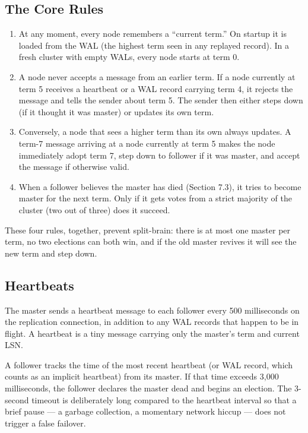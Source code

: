 \documentclass[11pt,a4paper]{article}
\begin{document}
\subsection{The Core Rules}
\begin{enumerate}
\item At any moment, every node remembers a ``current term.'' On startup it is loaded from the WAL (the highest term seen in any replayed record). In a fresh cluster with empty WALs, every node starts at term 0.
\item A node never accepts a message from an earlier term. If a node currently at term 5 receives a heartbeat or a WAL record carrying term 4, it rejects the message and tells the sender about term 5. The sender then either steps down (if it thought it was master) or updates its own term.
\item Conversely, a node that sees a higher term than its own always updates. A term-7 message arriving at a node currently at term 5 makes the node immediately adopt term 7, step down to follower if it was master, and accept the message if otherwise valid.
\item When a follower believes the master has died (Section 7.3), it tries to become master for the next term. Only if it gets votes from a strict majority of the cluster (two out of three) does it succeed.
\end{enumerate}

These four rules, together, prevent split-brain: there is at most one master per term, no two elections can both win, and if the old master revives it will see the new term and step down.

\subsection{Heartbeats}
The master sends a heartbeat message to each follower every 500 milliseconds on the replication connection, in addition to any WAL records that happen to be in flight. A heartbeat is a tiny message carrying only the master's term and current LSN.

A follower tracks the time of the most recent heartbeat (or WAL record, which counts as an implicit heartbeat) from its master. If that time exceeds 3{,}000 milliseconds, the follower declares the master dead and begins an election. The 3-second timeout is deliberately long compared to the heartbeat interval so that a brief pause --- a garbage collection, a momentary network hiccup --- does not trigger a false failover.
\end{document}
